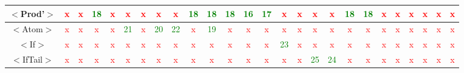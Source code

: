 \documentclass{article}
\begin{document}
\begin{center}
\begin{table}[H]
\begin{tabular}{|c|c|c|c|c|c|c|c|c|c|c|c|c|c|c|c|c|c|c|c|c|c|c|c|c|c|}
\hline
 $<$Prod'$>$        & \textcolor{red}{x}    & \textcolor{red}{x}  & \textcolor{green}{18} & \textcolor{red}{x}    & \textcolor{red}{x}     & \textcolor{red}{x}  & \textcolor{red}{x}     & \textcolor{red}{x}     & \textcolor{green}{18} & \textcolor{green}{18}  & \textcolor{green}{18}  & \textcolor{green}{16}  & \textcolor{green}{17}  & \textcolor{red}{x}     & \textcolor{red}{x}  & \textcolor{red}{x}     & \textcolor{red}{x}     & \textcolor{green}{18}  & \textcolor{green}{18}  & \textcolor{red}{x}     & \textcolor{red}{x}  & \textcolor{red}{x}    & \textcolor{red}{x}     & \textcolor{red}{x}      & \textcolor{red}{x} \\
\hline
 $<$Atom$>$         & \textcolor{red}{x}    & \textcolor{red}{x}  & \textcolor{red}{x}    & \textcolor{red}{x}    & \textcolor{green}{21}  & \textcolor{red}{x}  & \textcolor{green}{20}  & \textcolor{green}{22}  & \textcolor{red}{x}    & \textcolor{green}{19}  & \textcolor{red}{x}     & \textcolor{red}{x}     & \textcolor{red}{x}     & \textcolor{red}{x}     & \textcolor{red}{x}  & \textcolor{red}{x}     & \textcolor{red}{x}     & \textcolor{red}{x}     & \textcolor{red}{x}     & \textcolor{red}{x}     & \textcolor{red}{x}  & \textcolor{red}{x}    & \textcolor{red}{x}     & \textcolor{red}{x}      & \textcolor{red}{x} \\
\hline
 $<$If$>$           & \textcolor{red}{x}    & \textcolor{red}{x}  & \textcolor{red}{x}    & \textcolor{red}{x}    & \textcolor{red}{x}     & \textcolor{red}{x}  & \textcolor{red}{x}     & \textcolor{red}{x}     & \textcolor{red}{x}    & \textcolor{red}{x}     & \textcolor{red}{x}     & \textcolor{red}{x}     & \textcolor{red}{x}     & \textcolor{green}{23}  & \textcolor{red}{x}  & \textcolor{red}{x}     & \textcolor{red}{x}     & \textcolor{red}{x}     & \textcolor{red}{x}     & \textcolor{red}{x}     & \textcolor{red}{x}  & \textcolor{red}{x}    & \textcolor{red}{x}     & \textcolor{red}{x}      & \textcolor{red}{x} \\
\hline
 $<$IfTail$>$       & \textcolor{red}{x}    & \textcolor{red}{x}  & \textcolor{red}{x}    & \textcolor{red}{x}    & \textcolor{red}{x}     & \textcolor{red}{x}  & \textcolor{red}{x}     & \textcolor{red}{x}     & \textcolor{red}{x}    & \textcolor{red}{x}     & \textcolor{red}{x}     & \textcolor{red}{x}     & \textcolor{red}{x}     & \textcolor{red}{x}     & \textcolor{red}{x}  & \textcolor{green}{25}  & \textcolor{green}{24}  & \textcolor{red}{x}     & \textcolor{red}{x}     & \textcolor{red}{x}     & \textcolor{red}{x}  & \textcolor{red}{x}    & \textcolor{red}{x}     & \textcolor{red}{x}      & \textcolor{red}{x} \\

\end{tabular}
\end{table}
\end{center}
\end{document}

